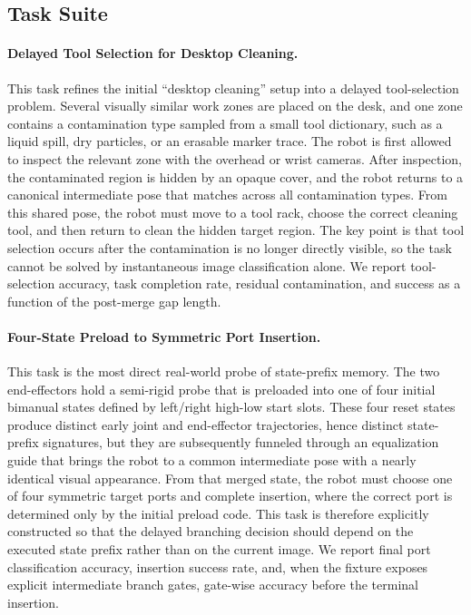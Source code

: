 \subsection{Task Suite}
\label{sec:real_world_tasks}

\paragraph{Delayed Tool Selection for Desktop Cleaning.}
This task refines the initial ``desktop cleaning'' setup into a delayed tool-selection problem. Several visually similar work zones are placed on the desk, and one zone contains a contamination type sampled from a small tool dictionary, such as a liquid spill, dry particles, or an erasable marker trace. The robot is first allowed to inspect the relevant zone with the overhead or wrist cameras. After inspection, the contaminated region is hidden by an opaque cover, and the robot returns to a canonical intermediate pose that matches across all contamination types. From this shared pose, the robot must move to a tool rack, choose the correct cleaning tool, and then return to clean the hidden target region. The key point is that tool selection occurs after the contamination is no longer directly visible, so the task cannot be solved by instantaneous image classification alone. We report tool-selection accuracy, task completion rate, residual contamination, and success as a function of the post-merge gap length.

\paragraph{Four-State Preload to Symmetric Port Insertion.}
This task is the most direct real-world probe of state-prefix memory. The two end-effectors hold a semi-rigid probe that is preloaded into one of four initial bimanual states defined by left/right high-low start slots. These four reset states produce distinct early joint and end-effector trajectories, hence distinct state-prefix signatures, but they are subsequently funneled through an equalization guide that brings the robot to a common intermediate pose with a nearly identical visual appearance. From that merged state, the robot must choose one of four symmetric target ports and complete insertion, where the correct port is determined only by the initial preload code. This task is therefore explicitly constructed so that the delayed branching decision should depend on the executed state prefix rather than on the current image. We report final port classification accuracy, insertion success rate, and, when the fixture exposes explicit intermediate branch gates, gate-wise accuracy before the terminal insertion.

